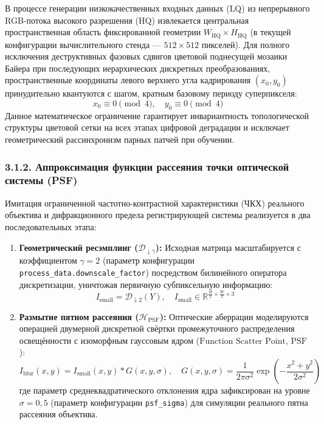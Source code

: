 \documentclass[12pt,a4paper]{article}
\begin{document}
В процессе генерации низкокачественных входных данных ($\text{LQ}$) из непрерывного RGB-потока высокого разрешения ($\text{HQ}$) извлекается центральная пространственная область фиксированной геометрии $W_{\operatorname{HQ}} \times H_{\operatorname{HQ}}$ (в текущей конфигурации вычислительного стенда --- $512 \times 512$ пикселей). Для полного исключения деструктивных фазовых сдвигов цветовой поднесущей мозаики Байера при последующих иерархических дискретных преобразованиях, пространственные координаты левого верхнего угла кадрирования $(x_0, y_0)$ принудительно квантуются с шагом, кратным базовому периоду суперпикселя:
\begin{equation}
x_0 \equiv 0 \pmod 4, \quad y_0 \equiv 0 \pmod 4
\end{equation}
Данное математическое ограничение гарантирует инвариантность топологической структуры цветовой сетки на всех этапах цифровой деградации и исключает геометрический рассинхронизм парных патчей при обучении.

\subsubsection{3.1.2. Аппроксимация функции рассеяния точки оптической системы (PSF)}

Имитация ограниченной частотно-контрастной характеристики ($\text{ЧКХ}$) реального объектива и дифракционного предела регистрирующей системы реализуется в два последовательных этапа:
\begin{enumerate}
    \item \textbf{Геометрический ресэмплинг ($\mathcal{D}_{\downarrow \gamma}$):} Исходная матрица масштабируется с коэффициентом $\gamma = 2$ (параметр конфигурации \texttt{process\_data.downscale\_factor}) посредством билинейного оператора дискретизации, уничтожая первичную субпиксельную информацию:
    \begin{equation}
    I_{\text{small}} = \mathcal{D}_{\downarrow 2}(Y), \quad I_{\text{small}} \in \mathbb{R}^{\frac{H}{2} \times \frac{W}{2} \times 3}
    \end{equation}
    \item \textbf{Размытие пятном рассеяния ($\mathcal{H}_{\operatorname{PSF}}$):} Оптические аберрации моделируются операцией двумерной дискретной свёртки промежуточного распределения освещённости с изоморфным гауссовым ядром ($\text{Function Scatter Point}$, $\text{PSF}$):
    \begin{equation}
    I_{\text{blur}}(x,y) = I_{\text{small}}(x,y) \ast G(x,y, \sigma), \quad G(x,y,\sigma) = \frac{1}{2\pi\sigma^2}\exp\left(-\frac{x^2+y^2}{2\sigma^2}\right)
    \end{equation}
    где параметр среднеквадратического отклонения ядра зафиксирован на уровне $\sigma = 0{,}5$ (параметр конфигурации \texttt{psf\_sigma}) для симуляции реального пятна рассеяния объектива.
\end{enumerate}
\end{document}
